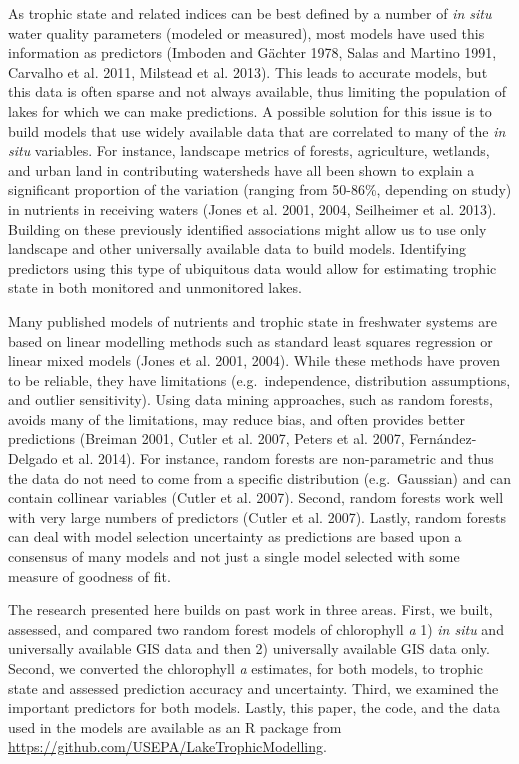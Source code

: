\documentclass[11pt,]{article}
\begin{document}
As trophic state and related indices can be best defined by a number of
\emph{in situ} water quality parameters (modeled or measured), most
models have used this information as predictors (Imboden and G{ä}chter
1978, Salas and Martino 1991, Carvalho et al. 2011, Milstead et al.
2013). This leads to accurate models, but this data is often sparse and
not always available, thus limiting the population of lakes for which we
can make predictions. A possible solution for this issue is to build
models that use widely available data that are correlated to many of the
\emph{in situ} variables. For instance, landscape metrics of forests,
agriculture, wetlands, and urban land in contributing watersheds have
all been shown to explain a significant proportion of the variation
(ranging from 50-86\%, depending on study) in nutrients in receiving
waters (Jones et al. 2001, 2004, Seilheimer et al. 2013). Building on
these previously identified associations might allow us to use only
landscape and other universally available data to build models.
Identifying predictors using this type of ubiquitous data would allow
for estimating trophic state in both monitored and unmonitored lakes.

Many published models of nutrients and trophic state in freshwater
systems are based on linear modelling methods such as standard least
squares regression or linear mixed models (Jones et al. 2001, 2004).
While these methods have proven to be reliable, they have limitations
(e.g.~independence, distribution assumptions, and outlier sensitivity).
Using data mining approaches, such as random forests, avoids many of the
limitations, may reduce bias, and often provides better predictions
(Breiman 2001, Cutler et al. 2007, Peters et al. 2007, Fernández-Delgado
et al. 2014). For instance, random forests are non-parametric and thus
the data do not need to come from a specific distribution
(e.g.~Gaussian) and can contain collinear variables (Cutler et al.
2007). Second, random forests work well with very large numbers of
predictors (Cutler et al. 2007). Lastly, random forests can deal with
model selection uncertainty as predictions are based upon a consensus of
many models and not just a single model selected with some measure of
goodness of fit.

The research presented here builds on past work in three areas. First,
we built, assessed, and compared two random forest models of chlorophyll
\emph{a} 1) \emph{in situ} and universally available GIS data and then
2) universally available GIS data only. Second, we converted the
chlorophyll \emph{a} estimates, for both models, to trophic state and
assessed prediction accuracy and uncertainty. Third, we examined the
important predictors for both models. Lastly, this paper, the code, and
the data used in the models are available as an R package from
\url{https://github.com/USEPA/LakeTrophicModelling}.
\end{document}

